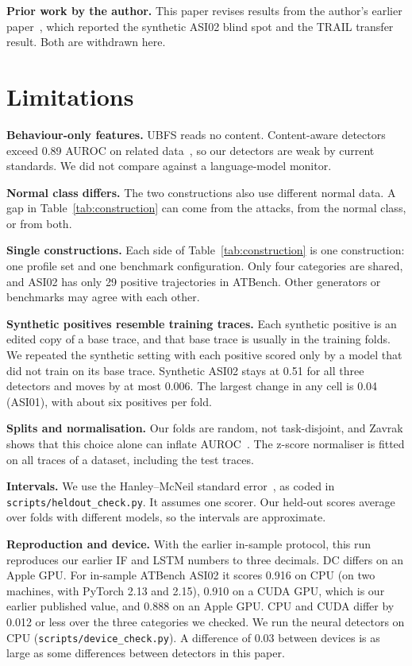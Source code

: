 \documentclass[conference]{IEEEtran}
\begin{document}
\textbf{Prior work by the author.} This paper revises results from the author's earlier paper~\cite{rimal2026ssrn}, which reported the synthetic ASI02 blind spot and the TRAIL transfer result. Both are withdrawn here.

\section{Limitations}
\label{sec:limits}

\textbf{Behaviour-only features.} UBFS reads no content. Content-aware detectors exceed 0.89 AUROC on related data~\cite{zavrak2026content}, so our detectors are weak by current standards. We did not compare against a language-model monitor.

\textbf{Normal class differs.} The two constructions also use different normal data. A gap in Table~\ref{tab:construction} can come from the attacks, from the normal class, or from both.

\textbf{Single constructions.} Each side of Table~\ref{tab:construction} is one construction: one profile set and one benchmark configuration. Only four categories are shared, and ASI02 has only 29 positive trajectories in ATBench. Other generators or benchmarks may agree with each other.

\textbf{Synthetic positives resemble training traces.} Each synthetic positive is an edited copy of a base trace, and that base trace is usually in the training folds. We repeated the synthetic setting with each positive scored only by a model that did not train on its base trace. Synthetic ASI02 stays at 0.51 for all three detectors and moves by at most 0.006. The largest change in any cell is 0.04 (ASI01), with about six positives per fold.

\textbf{Splits and normalisation.} Our folds are random, not task-disjoint, and Zavrak shows that this choice alone can inflate AUROC~\cite{zavrak2026content}. The z-score normaliser is fitted on all traces of a dataset, including the test traces.

\textbf{Intervals.} We use the Hanley--McNeil standard error~\cite{hanley1982meaning}, as coded in \texttt{scripts/heldout\_check.py}. It assumes one scorer. Our held-out scores average over folds with different models, so the intervals are approximate.

\textbf{Reproduction and device.} With the earlier in-sample protocol, this run reproduces our earlier IF and LSTM numbers to three decimals. DC differs on an Apple GPU. For in-sample ATBench ASI02 it scores 0.916 on CPU (on two machines, with PyTorch 2.13 and 2.15), 0.910 on a CUDA GPU, which is our earlier published value, and 0.888 on an Apple GPU. CPU and CUDA differ by 0.012 or less over the three categories we checked. We run the neural detectors on CPU (\texttt{scripts/device\_check.py}). A difference of 0.03 between devices is as large as some differences between detectors in this paper.
\end{document}
